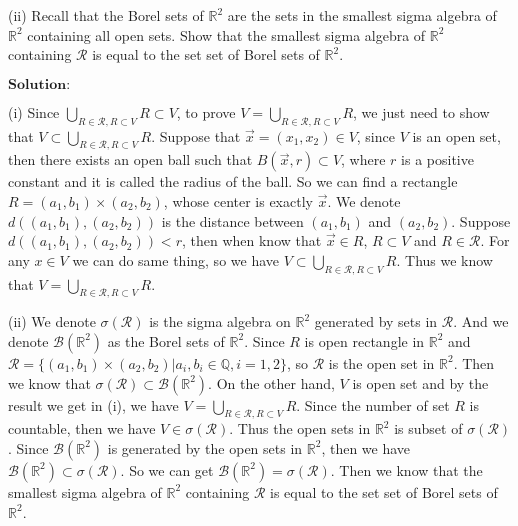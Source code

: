 \documentclass[12pt,a4paper]{ctexart}
\begin{document}
(ii) Recall that the Borel sets of $\mathbb{R}^{2}$ are the sets in the smallest sigma algebra of $\mathbb{R}^{2}$ containing all open sets. Show that the smallest sigma algebra of $\mathbb{R}^{2}$ containing $\mathcal{R}$ is equal to the set set of Borel sets of $\mathbb{R}^{2}$. 

\vspace{8pt}
$\textbf{Solution:}$

(i) Since $\bigcup_{R \in \mathcal{R}, R \subset V} R \subset V$, to prove $V = \bigcup_{R \in \mathcal{R}, R \subset V} R$, we just need to show that $V \subset \bigcup_{R \in \mathcal{R}, R \subset V} R$. Suppose that $\vec{x} = (x_{1}, x_{2}) \in V$, since $V$ is an open set, then there exists an open ball such that $B(\vec{x}, r) \subset V$, where $r$ is a positive constant and it is called the radius of the ball. So we can find a rectangle $ R = (a_{1}, b_{1}) \times (a_{2}, b_{2})$, whose center is exactly $\vec{x}$. We denote $d((a_{1}, b_{1}), (a_{2}, b_{2}))$ is the distance between $(a_{1}, b_{1})$ and $(a_{2}, b_{2})$. Suppose $d((a_{1}, b_{1}), (a_{2}, b_{2})) < r$, then when know that $\vec{x} \in R$, $R \subset V$ and $R \in \mathcal{R}$. For any $x \in V$ we can do same thing, so we have $V \subset \bigcup_{R \in \mathcal{R}, R \subset V} R$. Thus we know that $V = \bigcup_{R \in \mathcal{R}, R \subset V} R$.

(ii) We denote $\sigma(\mathcal{R})$ is the sigma algebra on $\mathbb{R}^{2}$ generated by sets in $\mathcal{R}$. And we denote $\mathcal{B}(\mathbb{R}^{2})$ as the Borel sets of $\mathbb{R}^{2}$. Since $R$ is open rectangle in $\mathbb{R}^{2}$ and $\mathcal{R} = \{(a_{1}, b_{1}) \times (a_{2}, b_{2}) | a_{i}, b_{i} \in \mathbb{Q}, i = 1, 2\}$, so $\mathcal{R}$ is the open set in $\mathbb{R}^{2}$. Then we know that $\sigma(\mathcal{R}) \subset \mathcal{B}(\mathbb{R}^{2})$. On the other hand, $V$ is open set and by the result we get in (i), we have $V = \bigcup_{R \in \mathcal{R}, R \subset V} R$. Since the number of set $R$ is countable, then we have $V \in \sigma(\mathcal{R})$. Thus the open sets in $\mathbb{R}^{2}$ is subset of $\sigma(\mathcal{R})$. Since $\mathcal{B}(\mathbb{R}^{2})$ is generated by the open sets in $\mathbb{R}^{2}$, then we have $\mathcal{B}(\mathbb{R}^{2}) \subset \sigma(\mathcal{R})$. So we can get $\mathcal{B}(\mathbb{R}^{2}) = \sigma(\mathcal{R})$. Then we know that the smallest sigma algebra of $\mathbb{R}^{2}$ containing $\mathcal{R}$ is equal to the set set of Borel sets of $\mathbb{R}^{2}$.
\end{document}
